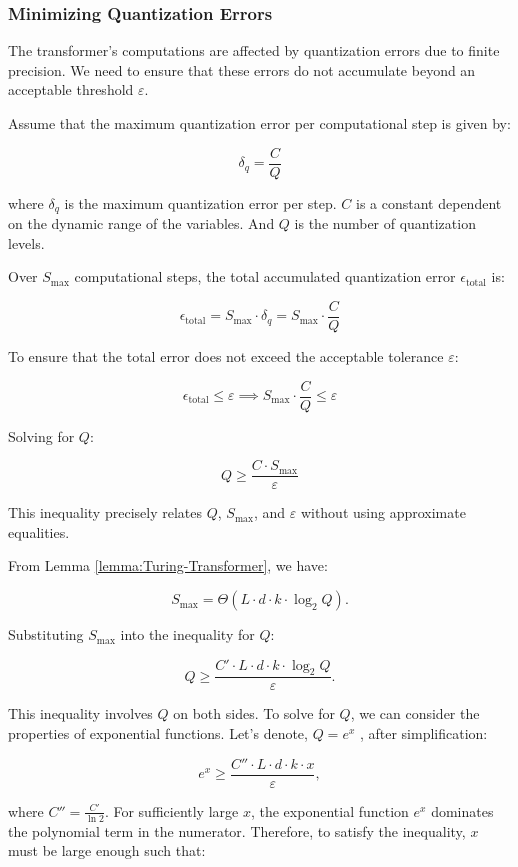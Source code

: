 \subsubsection{Minimizing Quantization Errors}
 The transformer’s computations are affected by quantization errors due to finite precision. We need to ensure that these errors do not accumulate beyond an acceptable threshold \( \varepsilon \).
{\color{black}
Assume that the maximum quantization error per computational step is given by:

\[
\delta_q = \frac{C}{Q}
\]

where \( \delta_q \) is the maximum quantization error per step. \( C \) is a constant dependent on the dynamic range of the variables. And \( Q \) is the number of quantization levels.

Over \( S_{\text{max}} \) computational steps, the total accumulated quantization error \( \epsilon_{\text{total}} \) is:

\[
\epsilon_{\text{total}} = S_{\text{max}} \cdot \delta_q = S_{\text{max}} \cdot \frac{C}{Q}
\]

To ensure that the total error does not exceed the acceptable tolerance \( \varepsilon \):

\[
\epsilon_{\text{total}} \leq \varepsilon \implies S_{\text{max}} \cdot \frac{C}{Q} \leq \varepsilon
\]

Solving for \( Q \):

\[
Q \geq \frac{C \cdot S_{\text{max}}}{\varepsilon}
\]

This inequality precisely relates \( Q \), \( S_{\text{max}} \), and \( \varepsilon \) without using approximate equalities.

From Lemma \ref{lemma:Turing-Transformer}, we have:

\[
S_{\text{max}} = \Theta( L \cdot d \cdot k \cdot \log_2 Q).
\]


Substituting \( S_{\text{max}} \) into the inequality for \( Q \):


\[
Q \geq \frac{C' \cdot L \cdot d \cdot k \cdot \log_2 Q}{\varepsilon}.
\]

This inequality involves \( Q \) on both sides. To solve for \( Q \), we can consider the properties of exponential functions. Let’s denote,
\(
Q = e^{x}
\)
,
after simplification:

\[
e^{x} \geq \frac{C'' \cdot L \cdot d \cdot k \cdot x}{\varepsilon},
\]

where \( C'' = \frac{C'}{\ln 2} \).
For sufficiently large \( x \), the exponential function \( e^{x} \) dominates the polynomial term in the numerator. Therefore, to satisfy the inequality, \( x \) must be large enough such that:

}
